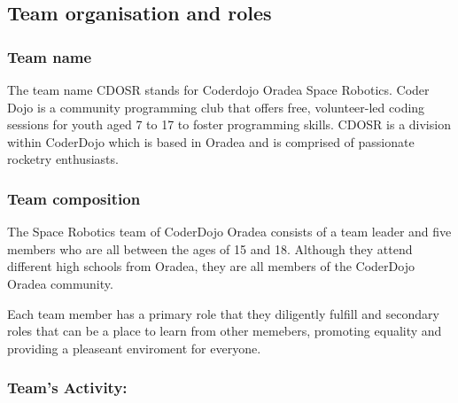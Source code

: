 \subsection{Team organisation and roles}

\subsubsection{Team name}
The team name CDOSR stands for Coderdojo Oradea Space Robotics. Coder Dojo is a community programming club that offers free, volunteer-led coding sessions for youth aged 7 to 17 to foster programming skills. CDOSR is a division within CoderDojo which is based in Oradea and is comprised of passionate rocketry enthusiasts. 

\subsubsection{Team composition}

The Space Robotics team of CoderDojo Oradea consists of a team leader and five members who are all between the ages of 15 and 18. Although they attend different high schools from Oradea, they are all members of the CoderDojo Oradea community. 

Each team member has a primary role that they diligently fulfill and secondary roles that can be a place to learn from other memebers, promoting equality and providing a pleaseant enviroment for everyone.
\vspace{1cm}
\begin{itemize}
    
    
    
    
    
    
\end{itemize}

\subsubsection{Team's Activity:} 

